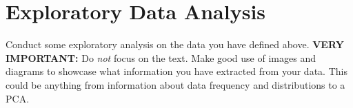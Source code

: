 \section{Exploratory Data Analysis}
\label{sec:eda}
Conduct some exploratory analysis on the data you have defined above. \textbf{VERY IMPORTANT:} Do \textit{not} focus on the text. Make good use of images and diagrams to showcase what information you have extracted from your data. This could be anything from information about data frequency and distributions to a PCA. 
